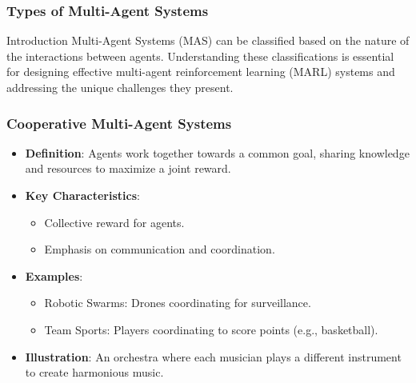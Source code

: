 \documentclass[aspectratio=169]{beamer}
\begin{document}
\begin{frame}[fragile]
    \frametitle{Types of Multi-Agent Systems}
    \begin{block}{Introduction}
        Multi-Agent Systems (MAS) can be classified based on the nature of the interactions between agents. Understanding these classifications is essential for designing effective multi-agent reinforcement learning (MARL) systems and addressing the unique challenges they present.
    \end{block}
\end{frame}

\begin{frame}[fragile]
    \frametitle{Cooperative Multi-Agent Systems}
    \begin{itemize}
        \item \textbf{Definition}: Agents work together towards a common goal, sharing knowledge and resources to maximize a joint reward.
        \item \textbf{Key Characteristics}:
            \begin{itemize}
                \item Collective reward for agents.
                \item Emphasis on communication and coordination.
            \end{itemize}
        \item \textbf{Examples}:
            \begin{itemize}
                \item Robotic Swarms: Drones coordinating for surveillance.
                \item Team Sports: Players coordinating to score points (e.g., basketball).
            \end{itemize}
        \item \textbf{Illustration}: An orchestra where each musician plays a different instrument to create harmonious music.
    \end{itemize}
\end{frame}
\end{document}
